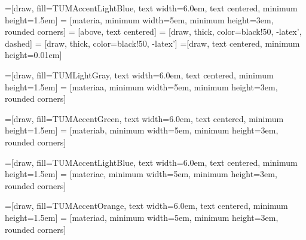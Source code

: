 
=[draw, fill=TUMAccentLightBlue, text width=6.0em, text centered,
minimum height=1.5em]
 = [materia, minimum width=5em,
minimum height=3em, rounded corners]
 = [above, text centered]
 = [draw, thick, color=black!50, -latex', dashed]
 = [draw, thick, color=black!50, -latex']
=[draw, text centered, minimum height=0.01em]

\newcommand{\blockdist}{1.3}
\newcommand{\edgedist}{1.5}


=[draw, fill=TUMLightGray, text width=6.0em, text centered,
minimum height=1.5em]
 = [materiaa, minimum width=5em,
minimum height=3em, rounded corners]
\newcommand{\defnodea}[2]{node (p#1) [practicaa]
	{{\scriptsize\textit{#2}}}}

=[draw, fill=TUMAccentGreen, text width=6.0em, text centered,
minimum height=1.5em]
 = [materiab, minimum width=5em,
minimum height=3em, rounded corners]
\newcommand{\defnodeb}[2]{node (p#1) [practicab]
	{{\scriptsize\textit{#2}}}}

=[draw, fill=TUMAccentLightBlue, text width=6.0em, text centered,
minimum height=1.5em]
 = [materiac, minimum width=5em,
minimum height=3em, rounded corners]
\newcommand{\defnodec}[2]{node (p#1) [practicac]
	{{\scriptsize\textit{#2}}}}

=[draw, fill=TUMAccentOrange, text width=6.0em, text centered,
minimum height=1.5em]
 = [materiad, minimum width=5em,
minimum height=3em, rounded corners]
\newcommand{\defnoded}[2]{node (p#1) [practicad]
	{{\scriptsize\textit{#2}}}}

\newcommand{\background}[5]{%
	\begin{pgfonlayer}{background}
		\path (#1.west |- #2.north)+(-0.5,0.5) node (a1) {};
		\path (#3.east |- #4.south)+(+0.5,-0.25) node (a2) {};
		\path[fill=white,rounded corners, draw=black!50, dashed]
		(a1) rectangle (a2);
		\path (a1.east |- a1.south)+(0.8,0.2) node (u1)[texto]
		{\normalsize\textit{#5}};
\end{pgfonlayer}}



